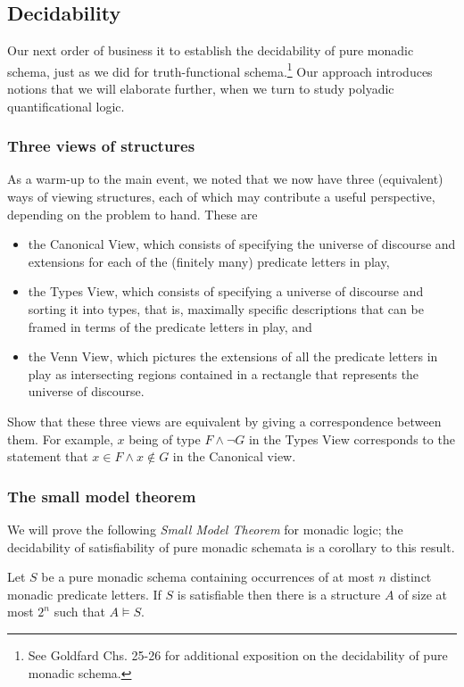 \subsection{Decidability}

Our next order of business it to establish the decidability of pure monadic schema, just as we did for truth-functional schema.\footnote{See Goldfard Chs. 25-26 for additional exposition on the decidability of pure monadic schema.}
Our approach introduces notions that we will elaborate further, when we turn to study polyadic quantificational logic.

\subsubsection*{Three views of structures}
As a warm-up to the main event, we noted that we now have three (equivalent) ways of viewing structures, each of which may contribute a useful perspective, depending on the problem to hand. These are
\begin{itemize}
\item 
the Canonical View, which consists of specifying the universe of discourse and extensions for each of the (finitely many) predicate letters in play,
\item 
the Types View, which consists of specifying a universe of discourse and sorting it into types, that is, maximally specific descriptions that can be framed in terms of the predicate letters in play, and
\item 
the Venn View, which pictures the extensions of all the predicate letters in play as intersecting regions contained in a rectangle that represents the universe of discourse.
\end{itemize}

\begin{aside}
    Show that these three views are equivalent by giving a correspondence between them. For example, $x$ being of type $F \land \lnot G$ in the Types View corresponds to the statement that $x \in F \land x \not \in G$ in the Canonical view. 
\end{aside}

\subsubsection*{The small model theorem}
We will prove the following \emph{Small Model Theorem} for monadic logic; the decidability of satisfiability of pure monadic schemata is a corollary to this result. 
\begin{theorem}\label{smm-thm}
Let $S$ be a pure monadic schema containing occurrences of at most $n$ distinct monadic predicate letters. If $S$ is satisfiable then there is a structure $A$ of size at most $2^n$ such that $A\models S$.
\end{theorem}

